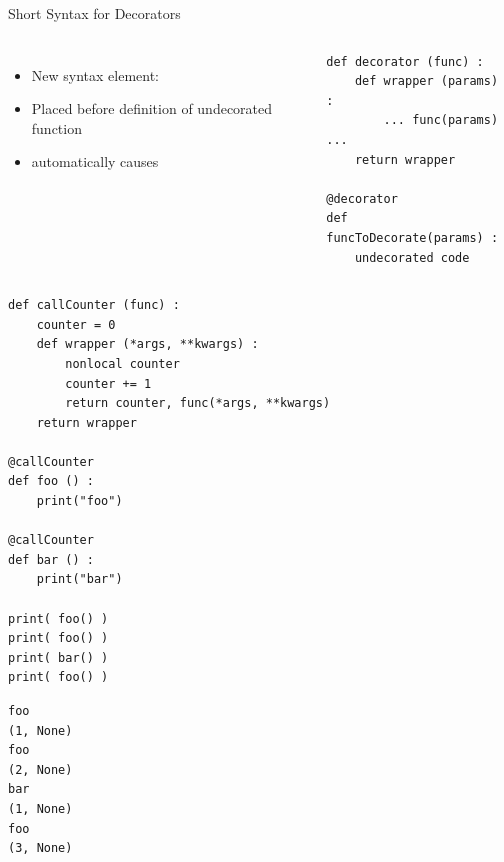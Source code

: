 \begin{frame}[fragile]{Short Syntax for Decorators}
%
\begin{columns}[T]
\begin{itemize}
\item New syntax element: 
\item Placed before definition of undecorated function
\item automatically causes 
\end{itemize}
%
\begin{codebox}
\begin{verbatim}
def decorator (func) :
    def wrapper (params) :
        ... func(params) ...
    return wrapper

@decorator
def funcToDecorate(params) :
    undecorated code
\end{verbatim}
\end{codebox}
\end{columns}
%
\end{frame}


\begin{frame}[fragile]
%
\begin{codebox}[Example: Call Counter, width=.60\linewidth, nobeforeafter, equal height group = grpCallCounter]
\begin{verbatim}
def callCounter (func) :
    counter = 0
    def wrapper (*args, **kwargs) :
        nonlocal counter
        counter += 1
        return counter, func(*args, **kwargs)
    return wrapper

@callCounter
def foo () :
    print("foo")

@callCounter
def bar () :
    print("bar")

print( foo() )
print( foo() )
print( bar() )
print( foo() )
\end{verbatim}
\end{codebox}
%
\begin{cmdbox}[Output: Call Counter, width=.39\linewidth, nobeforeafter, equal height group = grpCallCounter]
\begin{verbatim}
foo
(1, None)
foo
(2, None)
bar
(1, None)
foo
(3, None)
\end{verbatim}
\end{cmdbox}
%
\end{frame}

